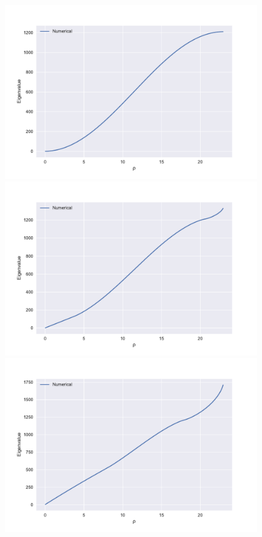\documentclass[a4paper]{article}
\begin{document}
\begin{figure}[h!]
\centering 
\includegraphics[scale=0.45]{../oppe_rho-23n-400l0-0122946.pdf}
\includegraphics[scale=0.45]{../oppe_rho-23n-400l0-224796.pdf}
\includegraphics[scale=0.45]{../oppe_rho-23n-400l0-412688.pdf}

\end{figure}
\end{document}
